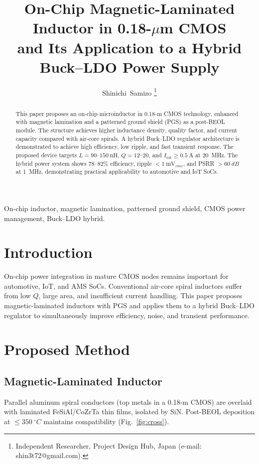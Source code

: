 \documentclass[journal]{IEEEtran}
\title{On-Chip Magnetic-Laminated Inductor in 0.18-\texorpdfstring{$\mu$}{\textmu}m CMOS\\
and Its Application to a Hybrid Buck--LDO Power Supply}
\author{Shinichi~Samizo%
\thanks{Independent Researcher, Project Design Hub, Japan (e-mail: shin3t72@gmail.com).}%
}
\begin{document}
\maketitle

\begin{abstract}
This paper proposes an on-chip microinductor in 0.18-\textmu m CMOS technology, enhanced with magnetic lamination and a patterned ground shield (PGS) as a post-BEOL module. The structure achieves higher inductance density, quality factor, and current capacity compared with air-core spirals. A hybrid Buck--LDO regulator architecture is demonstrated to achieve high efficiency, low ripple, and fast transient response. The proposed device targets $L=90$--$150~\mathrm{nH}$, $Q=12$--$20$, and $I_\mathrm{sat}\ge 0.5~\mathrm{A}$ at \SI{20}{\mega\hertz}. The hybrid power system shows $78$--$82\%$ efficiency, ripple $<\SI{1}{\milli\volt_{rms}}$, and PSRR $>\SI{60}{dB}$ at \SI{1}{\mega\hertz}, demonstrating practical applicability to automotive and IoT SoCs.
\end{abstract}

\begin{IEEEkeywords}
On-chip inductor, magnetic lamination, patterned ground shield, CMOS power management, Buck--LDO hybrid.
\end{IEEEkeywords}

\section{Introduction}
On-chip power integration in mature CMOS nodes remains important for automotive, IoT, and AMS SoCs. Conventional air-core spiral inductors suffer from low $Q$, large area, and insufficient current handling. This paper proposes magnetic-laminated inductors with PGS and applies them to a hybrid Buck--LDO regulator to simultaneously improve efficiency, noise, and transient performance.

\section{Proposed Method}
\subsection{Magnetic-Laminated Inductor}
Parallel aluminum spiral conductors (top metals in a 0.18-\textmu m CMOS) are overlaid with laminated FeSiAl/CoZrTa thin films, isolated by SiN. Post-BEOL deposition at $\le \SI{350}{^\circ C}$ maintains compatibility (Fig.~\ref{fig:cross}).
\end{document}
